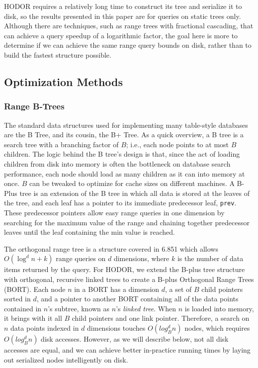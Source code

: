 \documentclass[11pt, oneside]{article}
\newcommand{\ms}{\texttt}
\begin{document}
HODOR requires a relatively long time to construct its tree and serialize it to
disk, so the results presented in this paper are for queries on static trees
only. Although there are techniques, such as range trees with fractional cascading,
that can achieve a query speedup of a logarithmic factor, the goal here is more
to determine if we can achieve the same range query bounds on disk, rather than
to build the fastest structure possible.

\subsection{Optimization Methods}
\subsubsection{Range B-Trees}

The standard data structures used for implementing many table-style databases
are the B Tree, and its cousin, the B+ Tree. As a quick overview, a B tree is a
search tree with a branching factor of $B$; i.e., each node points to at most
$B$ children. The logic behind the B tree's design is that, since the act of
loading children from disk into memory is often the bottleneck on database
search performance, each node should load as many children as it can into memory
at once. $B$ can be tweaked to optimize for cache sizes on different machines.
A B-Plus tree is an extension of the B tree in which all data is stored at the
leaves of the tree, and each leaf has a pointer to its immediate predecessor
leaf, \ms{prev}. These predecessor pointers allow easy range queries in one
dimension by searching for the maximum value of the range and chaining together
predecessor leaves until the leaf containing the min value is reached.

The orthogonal range tree is a structure covered in 6.851 which allows $O(\log^d
n + k)$ range queries on $d$ dimensions, where $k$ is the number of data items
returned by the query. For HODOR, we extend the B-plus tree structure with
orthogonal, recursive linked trees to create a B-plus Orthogonal Range Trees
(BORT). Each node $n$ in a BORT has a dimension $d$, a set of $B$ child pointers
sorted in $d$, and a pointer to another BORT containing all of the data points
contained in $n$'s subtree, known as $n$'s \textit{linked tree}.  When $n$ is
loaded into memory, it brings with it all $B$ child pointers and one link
pointer.  Therefore, a search on $n$ data points indexed in $d$ dimensions
touches $O(log^d_B n)$ nodes, which requires $O(log^d_B n)$ disk accesses.
However, as we will describe below, not all disk accesses are equal, and we can
achieve better in-practice running times by laying out serialized nodes
intelligently on disk.
\end{document}
